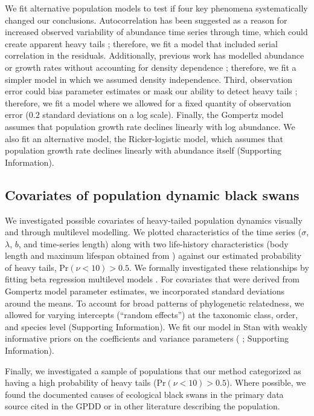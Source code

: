 We fit alternative population models to test if four key phenomena systematically changed our conclusions. Autocorrelation has been suggested as a reason for increased observed variability of abundance time series through time, which could create apparent heavy tails \citep{inchausti2002}; therefore, we fit a model that included serial correlation in the residuals. Additionally, previous work has modelled abundance or growth rates without accounting for density dependence \citep{halley2002,segura2013}; therefore, we fit a simpler model in which we assumed density independence. Third, observation error could bias parameter estimates \citep{knape2012} or mask our ability to detect heavy tails \citep{ward2007}; therefore, we fit a model where we allowed for a fixed quantity of observation error ($0.2$ standard deviations on a log scale). Finally, the Gompertz model assumes that population growth rate declines linearly with log abundance. We also fit an alternative model, the Ricker-logistic model, which assumes that population growth rate declines linearly with abundance itself (Supporting Information).

\subsection{Covariates of population dynamic black swans}

We investigated possible covariates of heavy-tailed population dynamics visually and through multilevel modelling. We plotted characteristics of the time series ($\sigma$, $\lambda$, $b$, and time-series length) along with two life-history characteristics (body length and maximum lifespan obtained from \citet{brook2006a}) against our estimated probability of heavy tails, Pr$(\nu < 10) > 0.5$. We formally investigated these relationships by fitting beta regression multilevel models \citep{ferrari2004}. For covariates that were derived from Gompertz model parameter estimates, we incorporated standard deviations around the means. To account for broad patterns of phylogenetic relatedness, we allowed for varying intercepts (``random effects'') at the taxonomic class, order, and species level (Supporting Information). We fit our model in Stan with weakly informative priors on the coefficients \citep{gelman2008d} and variance parameters (\citeauthor{gelman2006c} \citeyear{gelman2006c} \citeauthor{gelman2014} \citeyear{gelman2014}; Supporting Information).

Finally, we investigated a sample of populations that our method categorized as having a high probability of heavy tails (Pr$(\nu < 10) > 0.5$). Where possible, we found the documented causes of ecological black swans in the primary data source cited in the GPDD or in other literature describing the population.

